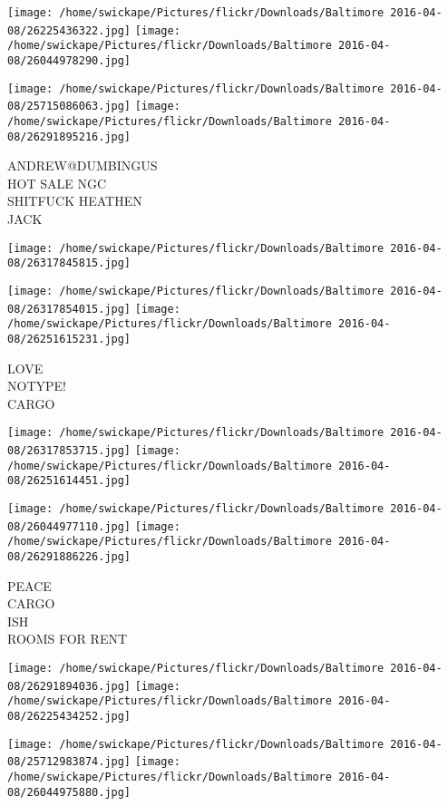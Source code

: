 \documentclass[10pt,letterpaper]{article}
\begin{document}
\texttt{[image: /home/swickape/Pictures/flickr/Downloads/Baltimore 2016-04-08/26225436322.jpg]}
\texttt{[image: /home/swickape/Pictures/flickr/Downloads/Baltimore 2016-04-08/26044978290.jpg]}

\texttt{[image: /home/swickape/Pictures/flickr/Downloads/Baltimore 2016-04-08/25715086063.jpg]}
\texttt{[image: /home/swickape/Pictures/flickr/Downloads/Baltimore 2016-04-08/26291895216.jpg]}

ANDREW@DUMBINGUS\\
HOT SALE NGC\\
SHITFUCK HEATHEN\\
JACK\\
\pagebreak

\texttt{[image: /home/swickape/Pictures/flickr/Downloads/Baltimore 2016-04-08/26317845815.jpg]}

\vspace{0.25in}
\texttt{[image: /home/swickape/Pictures/flickr/Downloads/Baltimore 2016-04-08/26317854015.jpg]}
\texttt{[image: /home/swickape/Pictures/flickr/Downloads/Baltimore 2016-04-08/26251615231.jpg]}

LOVE\\
NOTYPE!\\
CARGO\\
\pagebreak

\texttt{[image: /home/swickape/Pictures/flickr/Downloads/Baltimore 2016-04-08/26317853715.jpg]}
\texttt{[image: /home/swickape/Pictures/flickr/Downloads/Baltimore 2016-04-08/26251614451.jpg]}

\texttt{[image: /home/swickape/Pictures/flickr/Downloads/Baltimore 2016-04-08/26044977110.jpg]}
\texttt{[image: /home/swickape/Pictures/flickr/Downloads/Baltimore 2016-04-08/26291886226.jpg]}

PEACE\\
CARGO\\
ISH\\
ROOMS FOR RENT\\
\pagebreak

\texttt{[image: /home/swickape/Pictures/flickr/Downloads/Baltimore 2016-04-08/26291894036.jpg]}
\texttt{[image: /home/swickape/Pictures/flickr/Downloads/Baltimore 2016-04-08/26225434252.jpg]}

\texttt{[image: /home/swickape/Pictures/flickr/Downloads/Baltimore 2016-04-08/25712983874.jpg]}
\texttt{[image: /home/swickape/Pictures/flickr/Downloads/Baltimore 2016-04-08/26044975880.jpg]}
\end{document}
